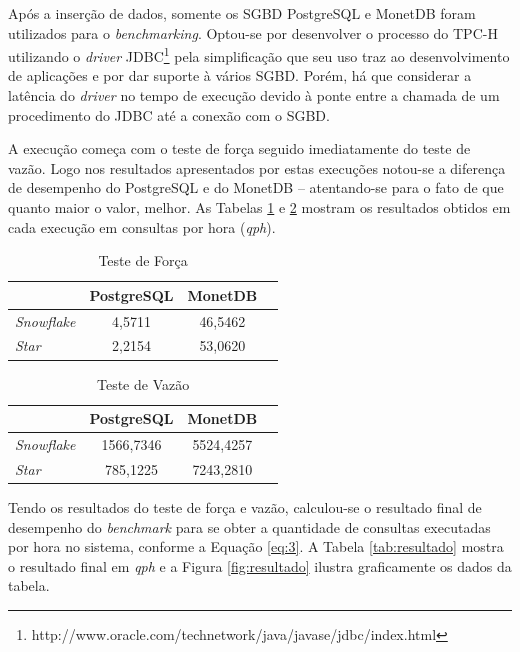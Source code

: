 \documentclass[conference]{IEEEtran}
\begin{document}
Após a inserção de dados, somente os SGBD PostgreSQL e MonetDB foram utilizados para o \textit{benchmarking}. Optou-se por desenvolver o processo do TPC-H utilizando o \textit{driver} JDBC\footnote{http://www.oracle.com/technetwork/java/javase/jdbc/index.html} pela simplificação que seu uso traz ao desenvolvimento de aplicações e por dar suporte à vários SGBD. Porém, há que considerar a latência do \textit{driver} no tempo de execução devido à ponte entre a chamada de um procedimento do JDBC até a conexão com o SGBD. 

A execução começa com o teste de força seguido imediatamente do teste de vazão. Logo nos resultados apresentados por estas execuções notou-se a diferença de desempenho do PostgreSQL e do MonetDB -- atentando-se para o fato de que quanto maior o valor, melhor. As Tabelas \ref{tab:forca} e \ref{tab:vazao} mostram os resultados obtidos em cada execução em consultas por hora (\textit{qph}).

\begin{table}[htpb]
\centering
\caption{Teste de Força}
\label{tab:forca}
\begin{tabular}{@{}lccc@{}}
\toprule
          & PostgreSQL & MonetDB \\ \midrule
\textit{Snowflake} & 4,5711     & 46,5462   \\
\textit{Star}      & 2,2154        & 53,0620     \\ \bottomrule
\end{tabular}
\end{table}

\begin{table}[htpb]
\centering
\caption{Teste de Vazão}
\label{tab:vazao}
\begin{tabular}{@{}lccc@{}}
\toprule
          & PostgreSQL & MonetDB \\ \midrule
\textit{Snowflake} & 1566,7346     & 5524,4257   \\
\textit{Star}      & 785,1225        & 7243,2810    \\ \bottomrule
\end{tabular}
\end{table}

Tendo os resultados do teste de força e vazão, calculou-se o resultado final de desempenho do \textit{benchmark} para se obter a quantidade de consultas executadas por hora no sistema, conforme a Equação \ref{eq:3}. A Tabela \ref{tab:resultado} mostra o resultado final em \textit{qph} e a Figura \ref{fig:resultado} ilustra graficamente os dados da tabela.
\end{document}
